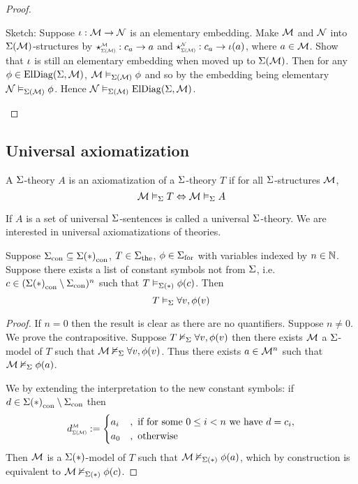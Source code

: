 \begin{proof}
    \begin{backward}
        Sketch: Suppose $\iota : \mathcal{M} \to \mathcal{N}$ is an elementary embedding.
        Make $\mathcal{M}$ and $\mathcal{N}$ into $\Sigma(\mathcal{M})$-structures by 
        $\intp{\Si(\MM)}{\MM}: c_a \to a$ and 
        $\intp{\Si(\MM)}{\NN}: c_a \to \io(a)$,
        where $a \in {\mathcal{M}}$.
        Show that $\iota$ is still an elementary embedding
        when moved up to $\Sigma(\mathcal{M})$.
        Then for any $\phi \in \mathrm{ElDiag}(\Sigma,\mathcal{M})$,
        $\mathcal{M} \vDash_{\Sigma(\mathcal{M})} \phi$ and so by the embedding being elementary
        $\mathcal{N} \vDash_{\Sigma(\mathcal{M})} \phi$.
        Hence $\mathcal{N} \vDash_{\Sigma(\mathcal{M})} \mathrm{ElDiag}(\Sigma,\mathcal{M})$.
    \end{backward}
\end{proof}

\subsection{Universal axiomatization}
\begin{dfn}
    A $\Sigma$-theory $A$ is an axiomatization of a 
    $\Sigma$-theory $T$ if for all $\Sigma$-structures $\mathcal{M}$,
    \[\mathcal{M} \vDash_{\Sigma} T \Leftrightarrow \mathcal{M} \vDash_{\Sigma} A\]

    If $A$ is a set of universal $\Sigma$-sentences 
    is called a universal $\Sigma$-theory.
    We are interested in universal axiomatizations of theories.
\end{dfn}

\begin{lem}
    Suppose ${\Sigma}_\mathrm{con} \subseteq {\Sigma(*)}_\mathrm{con}$, 
    $T \in {\Sigma}_\mathrm{the}$, $\phi \in {\Sigma}_\mathrm{for}$
    with variables indexed by $n \in \mathbb{N}$.
    Suppose there exists a list of constant symbols not from $\Sigma$, 
    i.e. $c \in ({\Sigma(*)}_\mathrm{con}\setminus {\Sigma}_\mathrm{con})^n$ 
    such that $T \vDash_{\Sigma(*)} \phi(c)$.
    Then \[
        T \vDash_{\Sigma} \forall v, \phi(v)
    \]
\end{lem}
\begin{proof}
    If $n = 0$ then the result is clear as there are no quantifiers.
    Suppose $n \ne 0$.
    We prove the contrapositive.
    Suppose $T \nvDash_{\Sigma} \forall v, \phi(v)$
    then there exists $\mathcal{M}$ a $\Sigma$-model of $T$
    such that $\mathcal{M} \nvDash_{\Sigma} \forall v, \phi(v)$.
    Thus there exists $a \in \mathcal{M}^n$ 
    such that $\mathcal{M} \nvDash_{\Sigma} \phi(a)$.

    We  
    by extending the interpretation 
    to the new constant symbols:
    if $d \in {\Sigma(*)}_\mathrm{con} \setminus {\Sigma}_\mathrm{con}$ then
    \[
        \subintp{\Si(\MM)}{\MM}{d} := 
        \begin{cases}
            a_i &, \text{ if for some } 0 \leq i < n \text{ we have }d = c_i,\\
            a_0 &, \text{ otherwise} 
        \end{cases}
    \]
    Then $\mathcal{M}$ is a $\Sigma(*)$-model of $T$ such that 
    $\mathcal{M} \nvDash_{\Sigma(*)} \phi(a)$, 
    which by construction is equivalent to 
    $\mathcal{M} \nvDash_{\Sigma(*)} \phi(c)$.
\end{proof}

